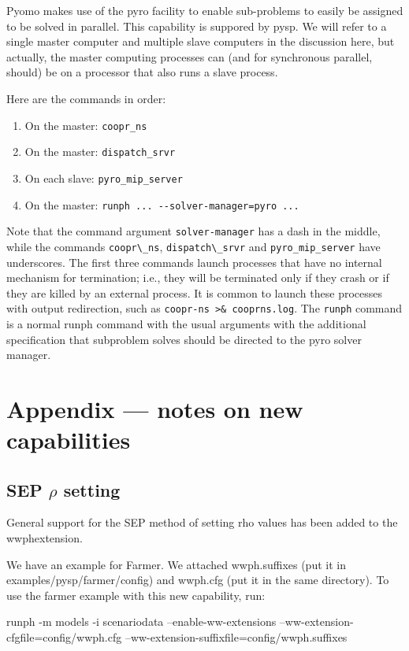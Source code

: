 Pyomo makes use of the pyro facility to enable sub-problems to easily be
assigned to be solved in parallel. This capability is suppored by pysp. We will
refer to a single master computer and multiple slave computers in the discussion
here, but actually, the master computing processes can (and for synchronous
parallel, should) be on a processor that also runs a slave process.

Here are the commands in order:

\begin{enumerate}
  \item On the master: \verb|coopr_ns|
  \item On the master: \verb|dispatch_srvr|
  \item On each slave: \verb|pyro_mip_server|
  \item On the master: \verb|runph ... --solver-manager=pyro ...|
\end{enumerate}

Note that the command
argument \verb|solver-manager| has
a dash in the middle, while the commands \verb|coopr\_ns|, \verb|dispatch\_srvr| and
\verb|pyro_mip_server| have underscores. The first three commands launch
processes that have no internal mechanism for termination; i.e., they will be
terminated only if they crash or if they are killed by an external process. It
is common to launch these processes with output redirection, such as
\verb|coopr-ns >& cooprns.log|. The \verb|runph| command is a normal runph
command with the usual arguments with the additional specification that
subproblem solves should be directed to the pyro solver manager.

\section{Appendix --- notes on new capabilities}

\subsection{SEP $\rho$ setting}

General support for the SEP method of setting rho values \cite{phinnovate}
has been added to the wwphextension.

We have an example for Farmer. We attached wwph.suffixes (put it in examples/pysp/farmer/config) and wwph.cfg (put it in the same directory). To use the farmer example with this new capability, run:

runph -m models -i scenariodata --enable-ww-extensions --ww-extension-cfgfile=config/wwph.cfg --ww-extension-suffixfile=config/wwph.suffixes

